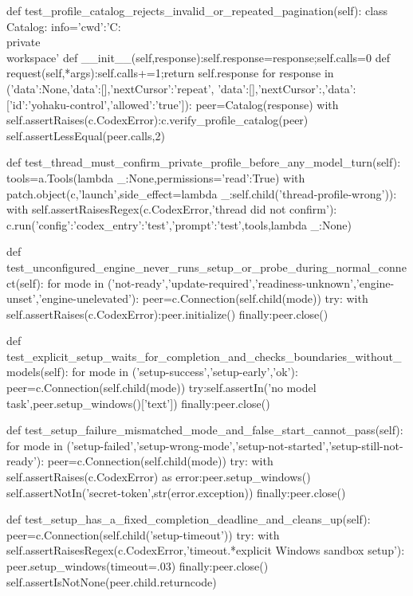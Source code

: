     def test_profile_catalog_rejects_invalid_or_repeated_pagination(self):
        class Catalog:
            info={'cwd':'C:\\private\\workspace'}
            def __init__(self,response):self.response=response;self.calls=0
            def request(self,*args):self.calls+=1;return self.response
        for response in ({'data':None},{'data':[],'nextCursor':'repeat'},
                         {'data':[],'nextCursor':{}},{'data':[{'id':'yohaku-control','allowed':'true'}]}):
            peer=Catalog(response)
            with self.assertRaises(c.CodexError):c.verify_profile_catalog(peer)
            self.assertLessEqual(peer.calls,2)

    def test_thread_must_confirm_private_profile_before_any_model_turn(self):
        tools=a.Tools(lambda _:None,permissions={'read':True})
        with patch.object(c,'launch',side_effect=lambda _:self.child('thread-profile-wrong')):
            with self.assertRaisesRegex(c.CodexError,'thread did not confirm'):
                c.run({'config':{'codex_entry':'test'},'prompt':'test'},tools,lambda _:None)

    def test_unconfigured_engine_never_runs_setup_or_probe_during_normal_connect(self):
        for mode in ('not-ready','update-required','readiness-unknown','engine-unset','engine-unelevated'):
            peer=c.Connection(self.child(mode))
            try:
                with self.assertRaises(c.CodexError):peer.initialize()
            finally:peer.close()

    def test_explicit_setup_waits_for_completion_and_checks_boundaries_without_models(self):
        for mode in ('setup-success','setup-early','ok'):
            peer=c.Connection(self.child(mode))
            try:self.assertIn('no model task',peer.setup_windows()['text'])
            finally:peer.close()

    def test_setup_failure_mismatched_mode_and_false_start_cannot_pass(self):
        for mode in ('setup-failed','setup-wrong-mode','setup-not-started','setup-still-not-ready'):
            peer=c.Connection(self.child(mode))
            try:
                with self.assertRaises(c.CodexError) as error:peer.setup_windows()
                self.assertNotIn('secret-token',str(error.exception))
            finally:peer.close()

    def test_setup_has_a_fixed_completion_deadline_and_cleans_up(self):
        peer=c.Connection(self.child('setup-timeout'))
        try:
            with self.assertRaisesRegex(c.CodexError,'timeout.*explicit Windows sandbox setup'):
                peer.setup_windows(timeout=.03)
        finally:peer.close()
        self.assertIsNotNone(peer.child.returncode)

